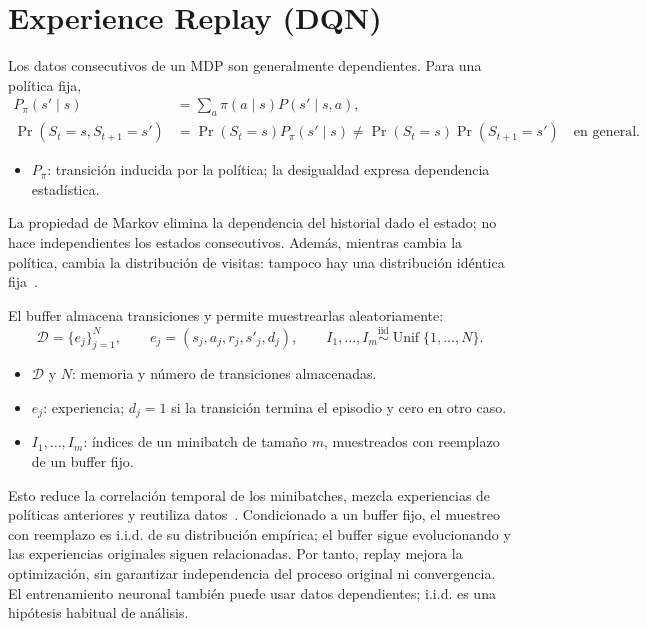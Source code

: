 \section{Experience Replay (DQN)}
Los datos consecutivos de un MDP son generalmente dependientes. Para una política fija,
\begin{equation}\label{eq:sequential-dependence}
\begin{aligned}
    P_\pi(s'\mid s)&=\sum_a\pi(a\mid s)P(s'\mid s,a),\\
    \Pr(S_t=s,S_{t+1}=s')&=\Pr(S_t=s)P_\pi(s'\mid s)
    \neq\Pr(S_t=s)\Pr(S_{t+1}=s')\quad\text{en general}.
\end{aligned}
\end{equation}
\begin{itemize}
    \item $P_\pi$: transición inducida por la política; la desigualdad expresa dependencia estadística.
\end{itemize}
La propiedad de Markov elimina la dependencia del historial dado el estado; no hace independientes los estados consecutivos. Además, mientras cambia la política, cambia la distribución de visitas: tampoco hay una distribución idéntica fija~\cite{mnih2013}.

El buffer almacena transiciones y permite muestrearlas aleatoriamente:
\begin{equation}\label{eq:replay}
    \mathcal{D}=\{e_j\}_{j=1}^{N},\qquad
    e_j=(s_j,a_j,r_j,s'_j,d_j),\qquad
    I_1,\ldots,I_m\overset{\mathrm{iid}}{\sim}\operatorname{Unif}\{1,\ldots,N\}.
\end{equation}
\begin{itemize}
    \item $\mathcal{D}$ y $N$: memoria y número de transiciones almacenadas.
    \item $e_j$: experiencia; $d_j=1$ si la transición termina el episodio y cero en otro caso.
    \item $I_1,\ldots,I_m$: índices de un minibatch de tamaño $m$, muestreados con reemplazo de un buffer fijo.
\end{itemize}
Esto reduce la correlación temporal de los minibatches, mezcla experiencias de políticas anteriores y reutiliza datos~\cite{mnih2015}. Condicionado a un buffer fijo, el muestreo con reemplazo es i.i.d. de su distribución empírica; el buffer sigue evolucionando y las experiencias originales siguen relacionadas. Por tanto, replay mejora la optimización, sin garantizar independencia del proceso original ni convergencia. El entrenamiento neuronal también puede usar datos dependientes; i.i.d. es una hipótesis habitual de análisis.
